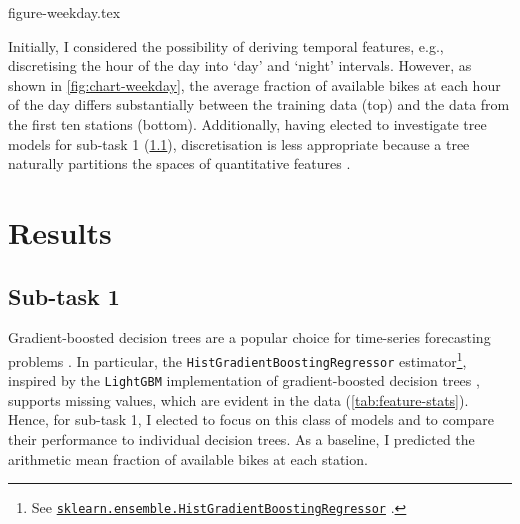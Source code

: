 \documentclass[11pt]{extarticle}
\newcommand{\sklearn}[1]{
  \href{https://scikit-learn.org/stable/modules/generated/sklearn.#1.html}{\lstinline|sklearn.#1|}
}
\begin{document}
{figure-weekday.tex}

Initially, I considered the possibility of deriving temporal features, e.g.,
discretising the hour of the day into `day' and `night' intervals.
However, as shown in \cref{fig:chart-weekday}, the average fraction of available bikes
at each hour of the day differs substantially between the training data (top)
and the data from the first ten stations (bottom).
Additionally, having elected to investigate tree models for sub-task 1
(\cref{sec:results-subtask-1}), discretisation is less appropriate because a tree
naturally partitions the spaces of quantitative features \parencite[155]{Flach2012}.

\section{Results}
\label{sec:results}

\subsection{Sub-task 1}
\label{sec:results-subtask-1}

Gradient-boosted decision trees are a popular choice for time-series forecasting
problems
\parencite{Bojer2021}.
In particular, the \texttt{HistGradientBoostingRegressor}
estimator\footnote{See \sklearn{ensemble.HistGradientBoostingRegressor}.}, inspired by
the \texttt{LightGBM} implementation of gradient-boosted decision trees
\parencite{Ke2017}, supports missing values, which are evident in the data
(\cref{tab:feature-stats}).
Hence, for sub-task 1, I elected to focus on this class of models and to compare their
performance to individual decision trees.
As a baseline, I predicted the arithmetic mean fraction of available bikes at each station.
\end{document}
